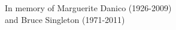 \documentclass[a4paper,12pt]{report} 	%
\numberwithin{figure}{chapter}
\numberwithin{table}{chapter}
\numberwithin{equation}{chapter}
\begin{document}
\newpage
\begin{center}
\vspace*{\fill}
In memory of Marguerite Danico (1926-2009)\\ and Bruce Singleton (1971-2011)
\vspace*{\fill}
\end{center}

\setcounter{tocdepth}{3}			%

\linespread{2}					%
\selectfont			
\setcounter{page}{3}
\tableofcontents

\newpage
{} 
\listoffigures

\newpage
{}
\listoftables
	
\newlength{\QuarterPage}
\setlength{\QuarterPage}{1.0in}
\end{document}
